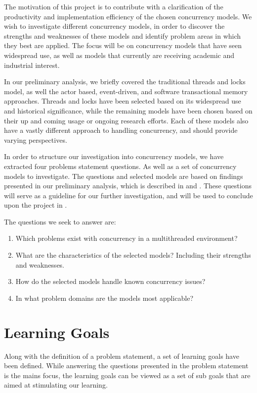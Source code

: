 \makeatletter {}\makeatother
{}
%
The motivation of this project is to contribute with a clarification of the productivity and implementation efficiency of the chosen concurrency models. We wish to investigate different concurrency models, in order to discover the strengths and weaknesses of these models and identify problem areas in which they best are applied. The focus will be on concurrency models that have seen widespread use, as well as models that currently are receiving academic and industrial interest.

In our preliminary analysis, we briefly covered the traditional threads and locks model, as well the actor based, event-driven, and software transactional memory approaches. Threads and locks have been selected based on its widespread use and historical significance, while the remaining models have been chosen based on their up and coming usage or ongoing research efforts. Each of these models also have a vastly different approach to handling concurrency, and should provide varying perspectives.

In order to structure our investigation into concurrency models, we have extracted four problems statement questions. As well as a set of concurrency models to investigate. The questions and selected models are based on findings presented in our preliminary analysis, which is described in  and . These questions will serve as a guideline for our further investigation, and will be used to conclude upon the project in .

The questions we seek to answer are:
\begin{enumerate}
\item Which problems exist with concurrency in a multithreaded environment? 
\item What are the characteristics of the selected models? Including their strengths and weaknesses.
\item How do the selected models handle known concurrency issues?
\item In what problem domains are the models most applicable?
\end{enumerate}

\section{Learning Goals}
Along with the definition of a problem statement, a set of learning goals have been defined. While answering the questions presented in the problem statement is the mains focus, the learning goals can be viewed as a set of sub goals that are aimed at stimulating our learning.

